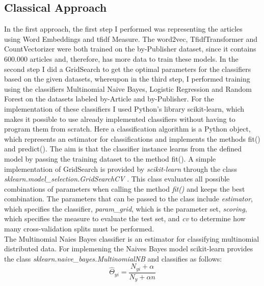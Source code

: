 \documentclass[a4paper, 11pt,titlepage,oneside,openany]{book}
\begin{document}
\subsection{Classical Approach}
In the first approach, the first step I performed was representing the articles using Word Embeddings and \gls{tfidf} Measure. The word2vec, TfidfTransformer and CountVectorizer were both trained on the by-Publisher dataset, since it contains 600.000  articles and, therefore, has more data to train these models. In the second step I did a GridSearch to get the optimal parameters for the classifiers based on the given datasets, whereupon in the third step, I performed training using the classifiers Multinomial Naive Bayes, Logistic Regression and Random Forest on the datasets labeled by-Article and by-Publisher. For the implementation of these classifiers I used Python's library scikit-learn, which makes it possible to use already implemented classifiers without having to program them from scratch. Here a classification algorithm is a Python object, which represents an estimator for classifications and implements the methods fit() and predict(). The aim is that the classifier instance learns from the defined model by passing the training dataset to the method fit().
\newpage
\indent A simple implementation of GridSearch is provided by \textit{scikit-learn} through the class \textit{sklearn.model\_selection.GridSearchCV} \cite{codegridsearch}. This class evaluates all possible combinations of parameters when calling the method \textit{fit()} and keeps the best combination. The parameters that can be passed to the class include \textit{estimator}, which specifies the classifier, \textit{param\_grid}, which is the parameter set, \textit{scoring}, which specifies the measure to evaluate the test set, and \textit{cv} to determine how many cross-validation splits must be performed. \\
\indent The Multinomial Naies Bayes classifier is an estimator for classifying multinomial distributed data. For implemening the Naives Bayes model scikit-learn provides the class \textit{sklearn.naive\_bayes.MultinomialNB} \cite{codemulinomialnb} and classifies as follows:
\[
\hat{\Theta}_{yi}=\frac{N_{yi}+\alpha}{N_y + \alpha n}
\]
\end{document}
